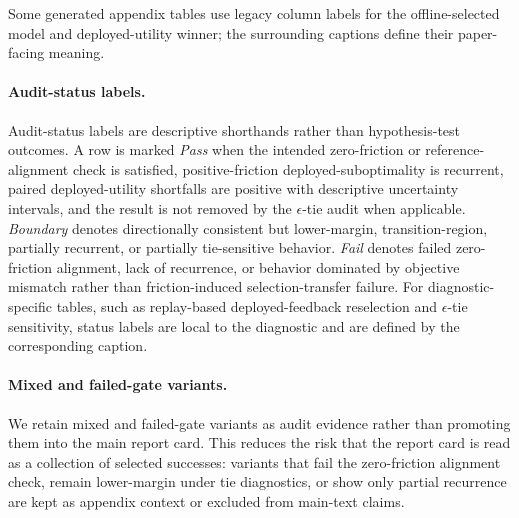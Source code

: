 \documentclass{article}
\begin{document}
Some generated appendix tables use legacy column labels for the offline-selected model and deployed-utility winner; the surrounding captions define their paper-facing meaning.

\paragraph{Audit-status labels.}
Audit-status labels are descriptive shorthands rather than hypothesis-test outcomes.
A row is marked \emph{Pass} when the intended zero-friction or reference-alignment check is satisfied, positive-friction deployed-suboptimality is recurrent, paired deployed-utility shortfalls are positive with descriptive uncertainty intervals, and the result is not removed by the \(\epsilon\)-tie audit when applicable.
\emph{Boundary} denotes directionally consistent but lower-margin, transition-region, partially recurrent, or partially tie-sensitive behavior.
\emph{Fail} denotes failed zero-friction alignment, lack of recurrence, or behavior dominated by objective mismatch rather than friction-induced selection-transfer failure.
For diagnostic-specific tables, such as replay-based deployed-feedback reselection and \(\epsilon\)-tie sensitivity, status labels are local to the diagnostic and are defined by the corresponding caption.

\paragraph{Mixed and failed-gate variants.}
We retain mixed and failed-gate variants as audit evidence rather than promoting them into the main report card. This reduces the risk that the report card is read as a collection of selected successes: variants that fail the zero-friction alignment check, remain lower-margin under tie diagnostics, or show only partial recurrence are kept as appendix context or excluded from main-text claims.
\end{document}
